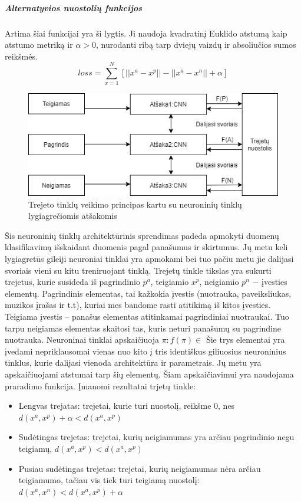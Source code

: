 \documentclass{VUMIFPSkursinis}
\begin{document}
\subparagraph{Alternatyvios nuostolių funkcijos}
Artima šiai funkcijai yra ši lygtis. Ji naudoja kvadratinį Euklido \cite{Aerial_image_similarity} atstumą kaip atstumo metriką ir $\alpha > 0$, nurodanti ribą tarp dviejų vaizdų ir absoliučios sumos reikšmės.
\[loss = \sum_{x=1}^{N} [||x^a - x^p|| - ||x^a - x^n|| + \alpha]\]

\begin{figure}[H]
\centering
\includegraphics[scale=0.8]{img/Triplet_network_branchCNN}
\caption{Trejeto tinklų veikimo principas kartu su neuroninių tinklų lygiagrečiomis atšakomis} %
\label{img:mlp}
\end{figure}

Šis neuroninių tinklų architektūrinis sprendimas padeda apmokyti duomenų klasifikavimą išskaidant duomenis pagal panašumus ir skirtumus. Jų metu keli lygiagretūs gileiji neuroniai tinklai yra apmokami bei tuo pačiu metu jie dalijasi svoriais vieni su kitu treniruojant tinklą. Trejetų tinkle tikslas yra sukurti trejetus, kurie susideda iš pagrindinio $p^a$, teigiamio $x^p$, neigiamio $p^n$ − įvesties elementų. Pagrindinis elementas, tai kažkokia įvestis (nuotrauka, paveiksliukas, muzikos įrašas ir t.t), kuriai mes bandome rasti atitikimą iš kitos įvesties. Teigiama įvestis – panašus elementas atitinkamai pagrindiniai nuotraukai. Tuo tarpu neigiamas elementas skaitosi tas, kuris neturi panašumų su pagrindine nuotrauka. Neuroninai tinklai apskaičiuoja  $\pi : f(\pi) \in$
Šie trys elementai yra įvedami nepriklausomai vienas nuo kito į  tris identiškus giliuosius neuroninius tinklus, kurie dalijasi vienoda architektūra ir parametrais. Jų metu yra apskaičiuojami atstumai tarp šių elementų. Šiam apskaičiavimui yra naudojama praradimo funkcija.
\linebreak
Įmanomi rezultatai trjetų tinkle:
\begin{itemize}
\item{Lengvas trejatas: trejetai, kurie turi nuostolį, reikšme 0, nes $d(x^a, x^p) + \alpha < d(x^a, x^p)$}
\item{Sudėtingas trejetas: trejetai, kurių neigiamumas yra arčiau pagrindinio negu teigiamų, $d(x^a, x^p) < d(x^a, x^p)$}
\item{Pusiau sudėtingas trejetas: trejetai, kurių neigiamumas nėra arčiau teigiamumo, tačiau vis tiek turi teigiamą nuostolį: $d(x^a, x^n) < d(x^a, x^p) +\alpha$}
\end{itemize}
\end{document}
